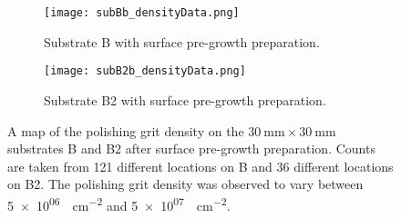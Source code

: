 \begin{figure}[htbp]
    \centering
    \begin{subfigure}[t]{0.8\textwidth}
        \centering
        \texttt{[image: subBb\_densityData.png]}
        \caption{Substrate B with surface pre-growth preparation.}\label{fig:subBb_densityData}
    \end{subfigure}
    \par\bigskip
    \begin{subfigure}[t]{0.8\textwidth}
        \centering
        \texttt{[image: subB2b\_densityData.png]}
        \caption{Substrate B2 with surface pre-growth preparation.}\label{fig:subB2b_densityData}
    \end{subfigure}
    \caption[Map of the polishing grit density on substrate B and B2 after surface pre-growth preparation.]{A map of the polishing grit density on the $\SI{30}{\milli\metre}\times\SI{30}{\milli\metre}$ substrates B and B2 after surface pre-growth preparation. Counts are taken from 121 different locations on B and 36 different locations on B2. The polishing grit density was observed to vary between \SI{5e+06}{\particle\centi\metre^{-2}} and \SI{5e+07}{\particle\centi\metre^{-2}}.}
    \label{fig:subBb_and_subB2b_densityData}
\end{figure}


